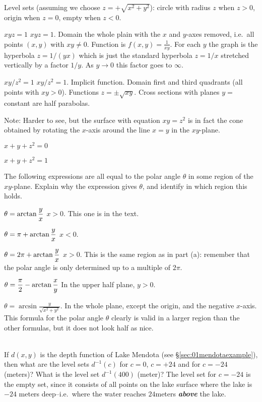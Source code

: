 \begin{multicols}{2}
Level sets (assuming we choose $z=+\sqrt{x^2+y^2}$):  circle with radius
$z$ when $z>0$, origin when $z=0$, empty when $z<0$.
\endanswer

\subprob $xyz=1$
\answer
$xyz=1$.
Domain the whole plain with the $x$ and $y$-axes removed, i.e.\ all
points $(x, y)$ with $xy\ne0$.
Function is $f(x, y) = \frac{1} {xy}$.
For each $y$ the graph is the hyperbola $z=1/(yx)$ which is just the
standard hyperbola $z=1/x$ stretched vertically by a factor $1/y$.
As $y\to 0$ this factor goes to $\infty$.
\endanswer

\subprob $xy/z^2=1$
\answer
$xy/z^2=1$.
Implicit function.
Domain first and third quadrants (all points with $xy>0$).
Functions $z= \pm \sqrt{xy}$.
Cross sections with planes $y=$constant are half parabolas.

Note: Harder to see, but the surface with equation $xy=z^2$ is in fact
the cone obtained by rotating the $x$-axis around the line
$x=y$ in the $xy$-plane.
\endanswer

\subprob $x+y+z^2=0$

\subprob $x+y+z^2=1$

\problem\label{prb:polar-angle-formula} 
The following expressions are all equal to the polar angle $\theta$ in some region of
the $xy$-plane.  Explain why the expression gives $\theta$, and identify in which
region this holds.

\subprob $\displaystyle \theta = \arctan \frac{y}{x}$
\answer
$x>0$.  This one is in the text.
\endanswer

\subprob $\displaystyle \theta = \pi+\arctan \frac{y}{x}$
\answer
$x<0$.
\endanswer

\subprob $\displaystyle \theta = 2\pi+\arctan \frac{y}{x}$
\answer
$x>0$.  This is the same region as in part (a):  remember that the polar angle is
only determined up to a multiple of $2\pi$.
\endanswer

\subprob $\displaystyle \theta = \frac\pi2 - \arctan \frac{x}{y}$
\answer
In the upper half plane, $y>0$.
\endanswer

\subprob $\theta=\arcsin \frac{y}{\sqrt{x^2+y^2}}$.
\answer
In the whole plane, except the origin, and the negative $x$-axis.  This formula for
the polar angle $\theta$ clearly is valid in a larger region than the other formulas,
but it does not look half as nice.
\endanswer


\\ 
If $d(x, y)$ is the depth function of Lake Mendota (see
\S\ref{sec:01mendotaexample}), then what are the level sets $d^{-1}(c)$
for $c=0$, $c=+24$ and for $c=-24$ (meters)?  What is the level
set $d^{-1}(400)$ (meter)?
\answer 
The level set for $c=-24$ is the empty set, since it consists of all points on
the lake surface where the lake is $-24$ meters deep--i.e.~where the water
reaches $24$meters {\bfseries\itshape above} the lake.    


\end{multicols}
